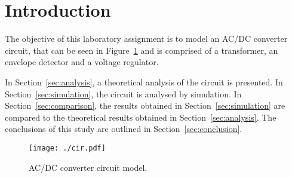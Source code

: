 \section{Introduction}
\label{sec:introduction}

The objective of this laboratory assignment is to model an AC/DC converter circuit, that can be seen in Figure~\ref{fig:cir} and is comprised of a transformer, an envelope detector and a voltage regulator.

In Section~\ref{sec:analysis}, a theoretical analysis of the circuit is
presented. In Section~\ref{sec:simulation}, the circuit is analysed by
simulation. In Section~\ref{sec:comparison}, the results obtained in Section~\ref{sec:simulation} are compared to the theoretical results obtained in
Section~\ref{sec:analysis}. The conclusions of this study are outlined in
Section~\ref{sec:conclusion}.

\begin{figure}[h] \centering
\texttt{[image: ./cir.pdf]}
\caption{AC/DC converter circuit model.}
\label{fig:cir}
\end{figure}

